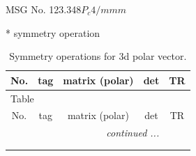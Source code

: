 \documentclass[fleqn,8pt]{jsarticle}
\begin{document}
\setcounter{MaxMatrixCols}{32}

\renewcommand{\tablename}{Table~}
\renewcommand{\figurename}{Figure~}
\begin{center}
\LARGE
MSG No. 123.348\quad$P_{c}4/mmm$
\end{center}
* symmetry operation
\renewcommand{\arraystretch}{1.3}
\begin{longtable}{ccccc}
\caption{Symmetry operations for 3d polar vector.}
 \\
 \hline \hline
No. & tag & matrix (polar) & det & TR \\ \hline \endfirsthead

\multicolumn{4}{l}{\tablename\ \thetable{}} \\
 \hline \hline
No. & tag & matrix (polar) & det & TR \\ \hline \endhead

 \hline \hline
\multicolumn{4}{r}{\footnotesize\it continued ...} \\ \endfoot

 \hline \hline
\multicolumn{4}{r}{} \\ \endlastfoot


\end{longtable}
\end{document}
